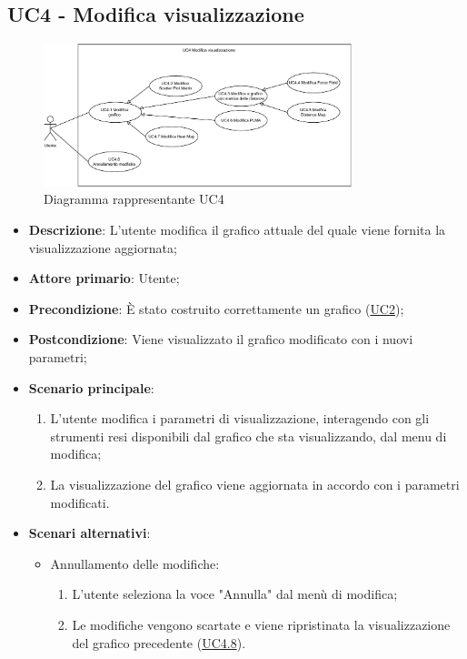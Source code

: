 \subsection{UC4 - Modifica visualizzazione}
\label{sub:uc4}

\begin{figure}[h]
    \centering
    \includegraphics[width=0.8\textwidth]{componenti/casi-duso/diagrammi/UC4.pdf}
    \caption{Diagramma rappresentante UC4}
    \label{fig:UC4}
\end{figure}


\begin{itemize}
    \item \textbf{Descrizione}: L’utente modifica il grafico attuale del quale viene fornita la visualizzazione 
    aggiornata;

    \item \textbf{Attore primario}: Utente;

    \item \textbf{Precondizione}:   È stato costruito correttamente un grafico (\hyperref[sub:uc2]{UC2});

    \item \textbf{Postcondizione}:  Viene visualizzato il grafico modificato con i nuovi parametri;

	\item \textbf{Scenario principale}:
		\begin{enumerate}
            \item L'utente modifica i parametri di visualizzazione, interagendo con gli strumenti resi disponibili dal 
            grafico che sta visualizzando, dal menu di modifica;
            \item La visualizzazione del grafico viene aggiornata in accordo con i parametri modificati.
        \end{enumerate}

    \item \textbf{Scenari alternativi}:
    \begin{itemize}
        \item Annullamento delle modifiche:
        \begin{enumerate}
            \item L'utente seleziona la voce "Annulla" dal menù di modifica;
            \item Le modifiche vengono scartate e viene ripristinata la visualizzazione del grafico precedente 
            (\hyperref[ssub:uc4.8]{UC4.8}).
        \end{enumerate}
    \end{itemize}

\end{itemize}

